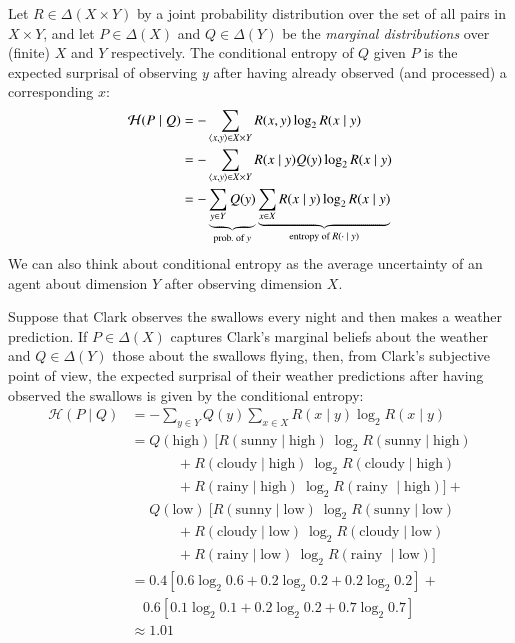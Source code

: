 \documentclass[nobib,nofonts]{tufte-handout}
\begin{document}
Let $R \in \Delta(X \times Y)$ by a joint probability distribution over the set of all pairs in $X \times Y$, and let $P \in \Delta(X)$ and $Q \in \Delta(Y)$ be the \emph{marginal distributions} over (finite) $X$ and $Y$ respectively.
The conditional entropy of $Q$ given $P$ is the expected surprisal of observing $y$ after having already observed (and processed) a corresponding $x$:
\begin{align*}
  \mathcal{H}(P \mid Q) & = - \sum_{\left \langle x,y\right\rangle \in X \times Y} R(x,y) \log_{2} R(x \mid y) \\
                        & = - \sum_{\left \langle x,y\right\rangle \in X \times Y} R(x \mid y) Q(y) \log_{2} R(x \mid y) \\
                        & = - \underbrace{\sum_{y \in Y} Q(y)}_{\text{prob.~of $y$}}
                          \underbrace{\sum_{x \in X} R(x \mid y) \log_{2} R(x \mid y)}_{\text{entropy of $R(\cdot \mid y)$}}
\end{align*}
We can also think about conditional entropy as the average uncertainty of an agent about dimension $Y$ after observing dimension $X$.

\begin{example}
  Suppose that Clark observes the swallows every night and then makes a weather prediction.
  If $P \in \Delta(X)$ captures Clark's marginal beliefs about the weather and $Q \in \Delta(Y)$ those about the swallows flying, then, from Clark's subjective point of view, the expected surprisal of their weather predictions after having observed the swallows is given by the conditional entropy:
  \begin{align*}
    \mathcal{H}(P \mid Q) & = - \sum_{y \in Y} Q(y)
                          \sum_{x \in X} R(x \mid y) \log_{2} R(x \mid y) \\
                          & = Q(\text{high}) \ [ R(\text{sunny} \mid \text{high}) \ \log_{2} R(\text{sunny} \mid \text{high})  \\
                          & \ \ \ \ \ \ \ \ \ \ \ \ \ \ \ + R(\text{cloudy} \mid \text{high}) \ \log_{2} R(\text{cloudy} \mid \text{high}) \\
                          & \ \ \ \ \ \ \ \ \ \ \ \ \ \ \ + R(\text{rainy} \mid \text{high}) \ \log_{2} R(\text{rainy } \mid \text{high}) ] + \\
                           &\ \ \  \ \ \ Q(\text{low}) \ [ R(\text{sunny} \mid \text{low}) \ \log_{2} R(\text{sunny} \mid \text{low})  \\
                          & \ \ \ \ \ \ \ \ \ \ \ \ \ \ \ + R(\text{cloudy} \mid \text{low}) \ \log_{2} R(\text{cloudy} \mid \text{low}) \\
                          & \ \ \ \ \ \ \ \ \ \ \ \ \ \ \ + R(\text{rainy} \mid \text{low}) \ \log_{2} R(\text{rainy } \mid \text{low}) ] \\
                          & = 0.4 [0.6 \log_{2} 0.6 +  0.2 \log_{2} 0.2 + 0.2 \log_{2} 0.2] + \\
                          & \ \ \ \ 0.6 [0.1 \log_{2} 0.1 +  0.2 \log_{2} 0.2 + 0.7 \log_{2} 0.7] \\
     & \approx 1.01
  \end{align*}
\end{example}
\end{document}
